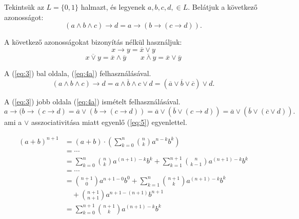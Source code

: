 \documentclass{article}
\theoremstyle{definition} %
\begin{document}
\noindent Tekintsük az $L = \{0, 1\}$ halmazt, és legyenek $a, b, c, d, \in L$. Belátjuk a következő azonosságot:
\begin{equation}\label{eq:3}
	(a \land b \land c) \to d = a \to (b \to (c \to d)).
	\tag{3}
\end{equation}

\noindent A következő azonosságokat bizonyítás nélkül használjuk:\label{eq:4}
\begin{equation}\label{eq:4a}
	x \to y = \overline{x} \lor y \tag{4a}
\end{equation}
\begin{equation}\label{eq:4b}
	\overline{x \lor y} = \overline{x} \land \overline{y} \qquad
	\overline{x \land y} = \overline{x} \lor \overline{y}
	\tag{4b}
\end{equation}

\noindent A (\ref{eq:3}) bal oldala, (\ref{eq:4a}) felhasználásával.
\begin{equation}\label{eq:5}
	(a \land b \land c) \to d = \overline{a \land b \land c} \lor d = (\overline{a} \lor \overline{b} \lor \overline{c}) \lor d. \tag{5}
\end{equation}

\noindent A (\ref{eq:3}) jobb oldala (\ref{eq:4a}) ismételt felhasználásával.
\begin{equation}
	a \to (b \to (c \to d) = \overline{a} \lor (b \to (c \to d))
	= \overline{a} \lor (\overline{b} \lor (c \to d))
	= \overline{a} \lor (\overline{b} \lor (\overline{c} \lor d)). \tag{6}
\end{equation}
\noindent ami a $\lor$ asszociativitása miatt egyenlő (\ref{eq:5}) egyenlettel.

\begin{align}
    (a+b)^{n+1} &= (a+b) \cdot \left( \sum_{k=0}^n \binom{n}{k} a^{n-k}b^k \right) \tag{7a} \label{eq:7a} \\
    &= \cdots \\
    &= \sum_{k=0}^n \binom{n}{k} a^{(n+1)-k}b^k + \sum_{k=1}^{n+1} \binom{n}{k-1} a^{(n+1)-k}b^{k} \tag{7b} \label{eq:7b} \\
    &= \cdots \\
    &= \binom{n+1}{0} a^{n+1-0} b^0 + \sum_{k=1}^n \binom{n+1}{k} a^{(n+1)-k}b^k \\
    &\quad + \binom{n+1}{n+1} a^{n+1-(n+1)} b^{n+1} \tag{7c} \label{eq:7c} \\
    &= \sum_{k=0}^{n+1} \binom{n+1}{k} a^{(n+1)-k}b^k \tag{7d} \label{eq:7d}
\end{align}
\end{document}
